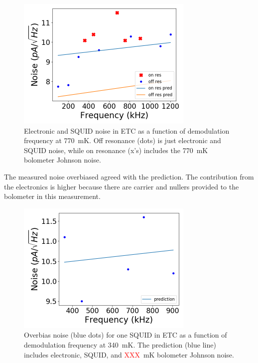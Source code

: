 \begin{figure}[ht!]
\begin{center}
\includegraphics[height=2.5in]{figures/squid_noise_770mK.png}
\caption{Electronic and \ac{SQUID} noise in \ac{ETC} as a function of demodulation frequency at 770~mK. Off resonance (dots) is just electronic and \ac{SQUID} noise, while on resonance (x's) includes the 770~mK bolometer Johnson noise. 
\label{fig:770mK_squid_noise} }
\end{center}
\end{figure}

The measured noise overbiased agreed with the prediction. 
The contribution from the electronics is higher because there are carrier and nullers provided to the bolometer in this measurement. 



\begin{figure}[ht!]
\begin{center}
\includegraphics[height=2.5in]{figures/overbias_noise.png}
\caption{Overbias noise (blue dots) for one \ac{SQUID} in \ac{ETC} as a function of demodulation frequency at 340~mK. The prediction (blue line) includes electronic, \ac{SQUID}, and \textcolor{red}{XXX}~mK bolometer Johnson noise. 
\label{fig:overbias_noise} }
\end{center}
\end{figure}



